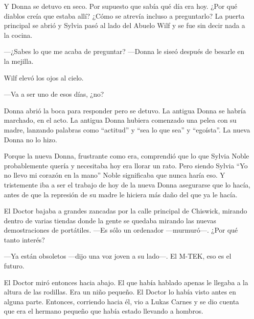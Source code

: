 Y Donna se detuvo en seco. Por supuesto que sabía qué día era hoy. ¿Por
qué diablos creía que estaba allí? ¿Cómo se atrevía incluso a
preguntarlo? La puerta principal se abrió y Sylvia pasó al lado del
Abuelo Wilf y se fue sin decir nada a la cocina.

---¿Sabes lo que me acaba de preguntar? ---Donna le siseó después de
besarle en la mejilla.

Wilf elevó los ojos al cielo.

---Va a ser uno de esos días, ¿no?

Donna abrió la boca para responder pero se detuvo. La antigua Donna se
habría marchado, en el acto. La antigua Donna hubiera comenzado una
pelea con su madre, lanzando palabras como ``actitud'' y ``sea lo que
sea'' y ``egoísta''. La nueva Donna no lo hizo.

Porque la nueva Donna, frustrante como era, comprendió que lo que Sylvia
Noble probablemente quería y necesitaba hoy era llorar un rato. Pero
siendo Sylvia ``Yo no llevo mi corazón en la mano'' Noble significaba
que nunca haría eso. Y tristemente iba a ser el trabajo de hoy de la
nueva Donna asegurarse que lo hacía, antes de que la represión de su
madre le hiciera más daño del que ya le hacía.

El Doctor bajaba a grandes zancadas por la calle principal de Chiswick,
mirando dentro de varias tiendas donde la gente se quedaba mirando las
nuevas demostraciones de portátiles. ---Es sólo un ordenador
---murmuró---. ¿Por qué tanto interés?

---Ya están obsoletos ---dijo una voz joven a su lado---. El M-TEK, eso
es el futuro.

El Doctor miró entonces hacia abajo. El que había hablado apenas le
llegaba a la altura de las rodillas. Era un niño pequeño. El Doctor lo
había visto antes en alguna parte. Entonces, corriendo hacia él, vio a
Lukas Carnes y se dio cuenta que era el hermano pequeño que había estado
llevando a hombros.